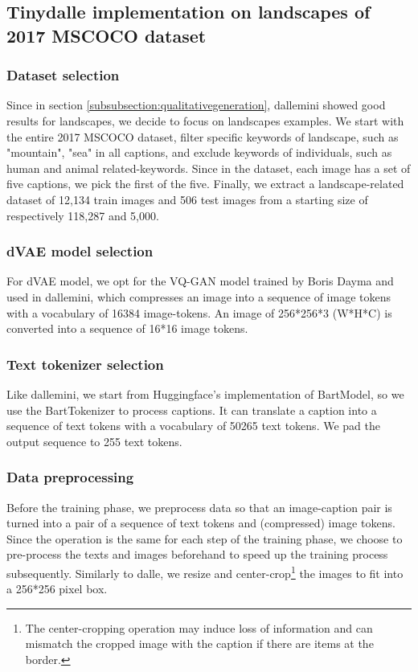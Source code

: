 \documentclass{article}
\begin{document}
\begin{multicols}{2}
\subsection{Tinydalle implementation on landscapes of 2017 MSCOCO dataset}

\subsubsection{Dataset selection}

Since in section \ref{subsubsection:qualitativegeneration}, \gls{dallemini} showed good results for landscapes, we decide to focus on landscapes examples. We start with the entire 2017 MSCOCO dataset, filter specific keywords of landscape, such as "mountain", "sea" in all captions, and exclude keywords of individuals, such as human and animal related-keywords. Since in the dataset, each image has a set of five captions, we pick the first of the five. Finally, we extract a landscape-related dataset of 12,134 train images and 506 test images from a starting size of respectively 118,287 and 5,000.

\subsubsection{dVAE model selection}

For dVAE model, we opt for the VQ-GAN model trained by Boris Dayma and used in \gls{dallemini}, which compresses an image into a sequence of image tokens with a vocabulary of 16384 image-tokens. An image of 256*256*3 (W*H*C) is converted into a sequence of 16*16 image tokens.

\subsubsection{Text tokenizer selection}
Like \gls{dallemini}, we start from Huggingface's implementation of BartModel, so we use the BartTokenizer to process captions. It can translate a caption into a sequence of text tokens with a vocabulary of 50265 text tokens. We pad the output sequence to 255 text tokens.

\subsubsection{Data preprocessing}

Before the training phase, we preprocess data so that an image-caption pair is turned into a pair of a sequence of text tokens and (compressed) image tokens. Since the operation is the same for each step of the training phase, we choose to pre-process the texts and images beforehand to speed up the training process subsequently. Similarly to \gls{dalle}, we resize and center-crop\footnote{The center-cropping operation may induce loss of information and can mismatch the cropped image with the caption if there are items at the border.} the images to fit into a 256*256 pixel box.


\end{multicols}
\end{document}
